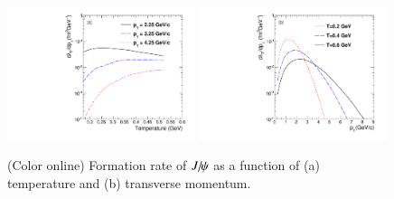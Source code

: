 {  \begin{figure}
    \includegraphics[width=0.49\textwidth]{Figures/Quarkonia_276TeV/Fig4a_FRateVsT.pdf}
    \includegraphics[width=0.49\textwidth]{Figures/Quarkonia_276TeV/Fig4b_FRateVsPt.pdf}
    \caption{(Color online) Formation rate of  $J\hspace{-.08em}/\hspace{-.14em}\psi$ as a function of (a) temperature and 
      (b) transverse momentum.}
    \label{fig:ForRateVsTempAndPt}
  \end{figure}
  
}
